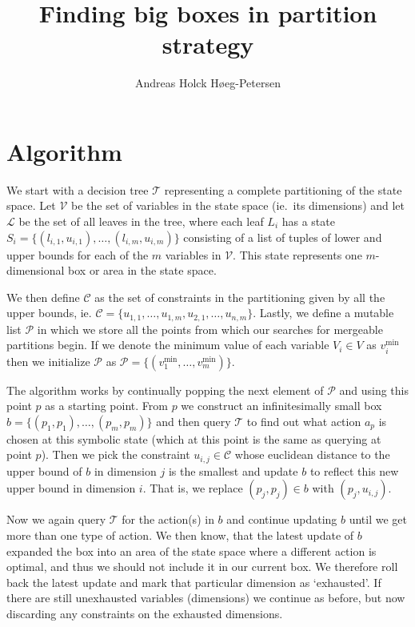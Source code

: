 \documentclass{article}
\title{Finding big boxes in partition strategy}
\author{Andreas Holck Høeg-Petersen}
\begin{document}
\maketitle

\section{Algorithm}

We start with a decision tree $\mathcal{T}$ representing a complete
partitioning of the state space. Let $\mathcal{V}$ be the set of variables in
the state space (ie.\ its dimensions) and let $\mathcal{L}$ be the set of all
leaves in the tree, where each leaf $L_{i}$ has a state $S_i =
\{(l_{i,1},u_{i,1}), \ldots, (l_{i,m},u_{i,m})\}$ consisting of a list of tuples
of lower and upper bounds for each of the $m$ variables in $\mathcal{V}$. This
state represents one $m$-dimensional box or area in the state space.

We then define $\mathcal{C}$ as the set of constraints in the partitioning given
by all the upper bounds, ie. $\mathcal{C} = \{ u_{1,1}, \ldots, u_{1,m},
u_{2,1}, \ldots, u_{n, m} \}$. Lastly, we define a mutable list $\mathcal{P}$ in
which we store all the points from which our searches for mergeable partitions
begin. If we denote the minimum value of each variable $V_i \in V$ as
$v^{\min}_i$ then we initialize $\mathcal{P}$ as $\mathcal{P} = \{ (v^{\min}_1,
\ldots, v^{\min}_m) \}$.

The algorithm works by continually popping the next element of $\mathcal{P}$ and
using this point $p$ as a starting point. From $p$ we construct an
infinitesimally small box $b = \{ (p_1, p_1), \ldots, (p_m,p_m) \}$ and then
query $\mathcal{T}$ to find out what action $a_p$ is chosen at this symbolic
state (which at this point is the same as querying at point $p$). Then we pick
the constraint $u_{i,j} \in \mathcal{C}$ whose euclidean distance to the upper
bound of $b$ in dimension $j$ is the smallest and update $b$ to reflect this new
upper bound in dimension $i$. That is, we replace $(p_j, p_j) \in b$ with $(p_j,
u_{i,j})$.

Now we again query $\mathcal{T}$ for the action(s) in $b$ and continue updating
$b$ until we get more than one type of action. We then know, that the latest
update of $b$ expanded the box into an area of the state space where a different
action is optimal, and thus we should not include it in our current box. We
therefore roll back the latest update and mark that particular dimension as
`exhausted'. If there are still unexhausted variables (dimensions) we continue
as before, but now discarding any constraints on the exhausted dimensions.
\end{document}
